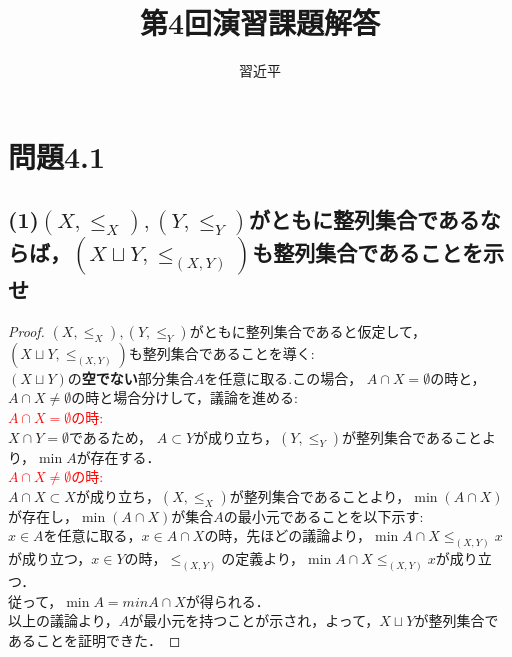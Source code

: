 \documentclass{jreport}
\begin{document}
\title{第4回演習課題解答}
\author{習近平}
\maketitle
\setcounter{chapter}{4}
\newpage
\tableofcontents
{}
\newpage
\section{問題4.1}
\subsection{\normalsize{(1)$(X,\le_{X}),(Y,\le_{Y})$がともに整列集合であるならば，$(X\sqcup Y, \le_{(X,Y)})$も整列集合であることを示せ}}
\begin{proof}
  $(X,\le_{X}),(Y,\le_{Y})$がともに整列集合であると仮定して，{$(X\sqcup Y, \le_{(X,Y)})$}も整列集合であることを導く:\\
  $(X\sqcup Y)$の\textbf{空でない}部分集合$A$を任意に取る.この場合，
  $A\cap X = \emptyset$の時と，
  $A\cap X \ne \emptyset$の時と場合分けして，議論を進める:\\
  \textcolor{red}{$A\cap X = \emptyset$の時:\\}
  $X\cap Y = \emptyset$であるため， $A \subset Y$が成り立ち，$(Y,\le_{Y})$が整列集合であることより，$\min A$が存在する．\\
  \textcolor{red}{$A\cap X \ne \emptyset$の時:\\}
	$A\cap X \subset X$が成り立ち，$(X,\le_{X})$が整列集合であることより，$\min (A\cap X) $が存在し，$\min (A\cap X) $が集合$A$の最小元であることを以下示す:\\
  $x \in A$を任意に取る，$x \in A\cap X$の時，先ほどの議論より，$\min A\cap X \le_{(X,Y)} x$が成り立つ，$x \in Y$の時，$\le_{(X,Y)}$の定義より，$\min A\cap X \le_{(X,Y)} x $が成り立つ．\\
  従って，$\min A = min A\cap X$が得られる．\\
  以上の議論より，$A$が最小元を持つことが示され，よって，$X \sqcup Y$が整列集合であることを証明できた．
\end{proof}
\newpage
\end{document}
